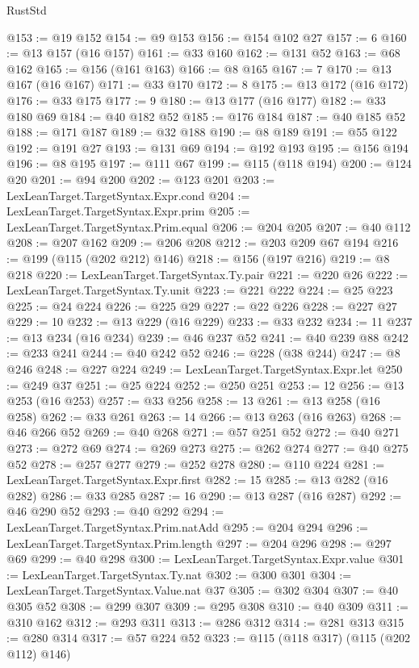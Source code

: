 \begin{lexlean}{RustStd}
\begin{coremodule}
@153 := @19 @152
@154 := @9 @153
@156 := @154 @102 @27
@157 := 6
@160 := @13 @157 (@16 @157)
@161 := @33 @160
@162 := @131 @52
@163 := @68 @162
@165 := @156 (@161 @163)
@166 := @8 @165
@167 := 7
@170 := @13 @167 (@16 @167)
@171 := @33 @170
@172 := 8
@175 := @13 @172 (@16 @172)
@176 := @33 @175
@177 := 9
@180 := @13 @177 (@16 @177)
@182 := @33 @180 @69
@184 := @40 @182 @52
@185 := @176 @184
@187 := @40 @185 @52
@188 := @171 @187
@189 := @32 @188
@190 := @8 @189
@191 := @55 @122
@192 := @191 @27
@193 := @131 @69
@194 := @192 @193
@195 := @156 @194
@196 := @8 @195
@197 := @111 @67
@199 := @115 (@118 @194)
@200 := @124 @20
@201 := @94 @200
@202 := @123 @201
@203 := LexLeanTarget.TargetSyntax.Expr.cond
@204 := LexLeanTarget.TargetSyntax.Expr.prim
@205 := LexLeanTarget.TargetSyntax.Prim.equal
@206 := @204 @205
@207 := @40 @112
@208 := @207 @162
@209 := @206 @208
@212 := @203 @209 @67 @194
@216 := @199 (@115 (@202 @212) @146)
@218 := @156 (@197 @216)
@219 := @8 @218
@220 := LexLeanTarget.TargetSyntax.Ty.pair
@221 := @220 @26
@222 := LexLeanTarget.TargetSyntax.Ty.unit
@223 := @221 @222
@224 := @25 @223
@225 := @24 @224
@226 := @225 @29
@227 := @22 @226
@228 := @227 @27
@229 := 10
@232 := @13 @229 (@16 @229)
@233 := @33 @232
@234 := 11
@237 := @13 @234 (@16 @234)
@239 := @46 @237 @52
@241 := @40 @239 @88
@242 := @233 @241
@244 := @40 @242 @52
@246 := @228 (@38 @244)
@247 := @8 @246
@248 := @227 @224
@249 := LexLeanTarget.TargetSyntax.Expr.let
@250 := @249 @37
@251 := @25 @224
@252 := @250 @251
@253 := 12
@256 := @13 @253 (@16 @253)
@257 := @33 @256
@258 := 13
@261 := @13 @258 (@16 @258)
@262 := @33 @261
@263 := 14
@266 := @13 @263 (@16 @263)
@268 := @46 @266 @52
@269 := @40 @268
@271 := @57 @251 @52
@272 := @40 @271
@273 := @272 @69
@274 := @269 @273
@275 := @262 @274
@277 := @40 @275 @52
@278 := @257 @277
@279 := @252 @278
@280 := @110 @224
@281 := LexLeanTarget.TargetSyntax.Expr.first
@282 := 15
@285 := @13 @282 (@16 @282)
@286 := @33 @285
@287 := 16
@290 := @13 @287 (@16 @287)
@292 := @46 @290 @52
@293 := @40 @292
@294 := LexLeanTarget.TargetSyntax.Prim.natAdd
@295 := @204 @294
@296 := LexLeanTarget.TargetSyntax.Prim.length
@297 := @204 @296
@298 := @297 @69
@299 := @40 @298
@300 := LexLeanTarget.TargetSyntax.Expr.value
@301 := LexLeanTarget.TargetSyntax.Ty.nat
@302 := @300 @301
@304 := LexLeanTarget.TargetSyntax.Value.nat @37
@305 := @302 @304
@307 := @40 @305 @52
@308 := @299 @307
@309 := @295 @308
@310 := @40 @309
@311 := @310 @162
@312 := @293 @311
@313 := @286 @312
@314 := @281 @313
@315 := @280 @314
@317 := @57 @224 @52
@323 := @115 (@118 @317) (@115 (@202 @112) @146)

\end{coremodule}
\end{lexlean}
